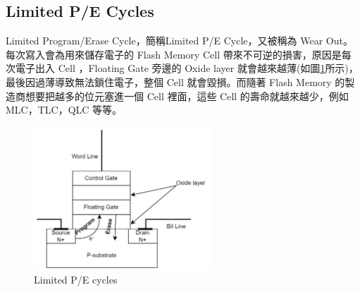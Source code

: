 \subsection{Limited P/E Cycles}\label{s2.1.4}
\indent
Limited Program/Erase Cycle，簡稱Limited P/E Cycle，又被稱為 Wear Out。每次寫入會為用來儲存電子的 Flash Memory Cell 帶來不可逆的損害，原因是每次電子出入 Cell ，Floating Gate 旁邊的 Oxide layer 就會越來越薄(如圖\ref{f2.3}所示)，最後因過薄導致無法鎖住電子，整個 Cell 就會毀損\cite{8631191}。而隨著 Flash Memory 的製造商想要把越多的位元塞進一個 Cell 裡面，這些 Cell 的壽命就越來越少，例如 MLC，TLC，QLC 等等。
\begin{figure}[H]
    \centering
    \includegraphics[width=0.6\textwidth]{picture/ch2/Limited_P-E_Cycles.png}
    \caption{Limited P/E cycles}
    \label{f2.3}
\end{figure}

